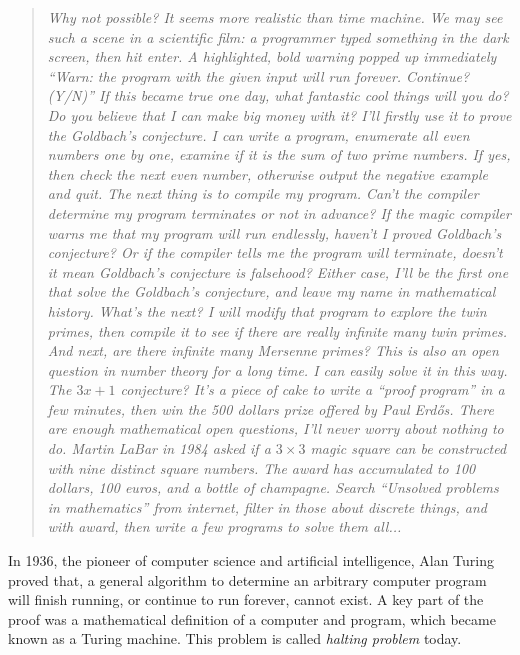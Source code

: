 \documentclass[b5paper]{article}
\begin{document}
\begin{quotation}
\itshape
Why not possible? It seems more realistic than time machine. We may see such a scene in a scientific film: a programmer typed something in the dark screen, then hit enter. A highlighted, bold warning popped up immediately ``Warn: the program with the given input will run forever. Continue? (Y/N)'' If this became true one day, what fantastic cool things will you do? Do you believe that I can make big money with it? I'll firstly use it to prove the Goldbach's conjecture. I can write a program, enumerate all even numbers one by one, examine if it is the sum of two prime numbers. If yes, then check the next even number, otherwise output the negative example and quit. The next thing is to compile my program. Can't the compiler determine my program terminates or not in advance? If the magic compiler warns me that my program will run endlessly, haven't I proved Goldbach's conjecture? Or if the compiler tells me the program will terminate, doesn't it mean Goldbach's conjecture is falsehood? Either case, I'll be the first one that solve the Goldbach's conjecture, and leave my name in mathematical history. What's the next? I will modify that program to explore the twin primes, then compile it to see if there are really infinite many twin primes. And next, are there infinite many Mersenne primes? This is also an open question in number theory for a long time. I can easily solve it in this way. The $3x + 1$ conjecture? It's a piece of cake to write a ``proof program'' in a few minutes, then win the 500 dollars prize offered by Paul Erdős. There are enough mathematical open questions, I'll never worry about nothing to do. Martin LaBar in 1984 asked if a $3 \times 3$ magic square can be constructed with nine distinct square numbers. The award has accumulated to 100 dollars, 100 euros, and a bottle of champagne. Search ``Unsolved problems in mathematics'' from internet, filter in those about discrete things, and with award, then write a few programs to solve them all...
\end{quotation}

In 1936, the pioneer of computer science and artificial intelligence, Alan Turing proved that, a general algorithm to determine an arbitrary computer program will finish running, or continue to run forever, cannot exist. A key part of the proof was a mathematical definition of a computer and program, which became known as a Turing machine. This problem is called {\em halting problem} today.
\end{document}
